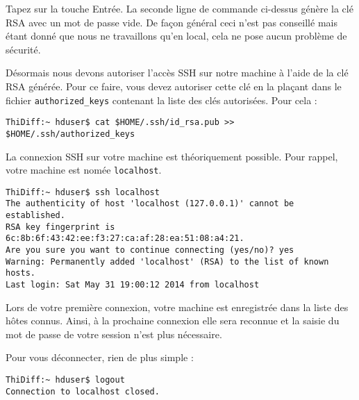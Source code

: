 \par Tapez sur la touche Entrée. La seconde ligne de commande ci-dessus génère la clé RSA avec un mot de passe vide. De façon général ceci n'est pas conseillé mais étant donné que nous ne travaillons qu'en local, cela ne pose aucun problème de sécurité.

\par Désormais nous devons autoriser l'accès SSH sur notre machine à l'aide de la clé RSA générée. Pour ce faire, vous devez autoriser cette clé en la plaçant dans le fichier \texttt{authorized\_keys} contenant la liste des clés autorisées. Pour cela :

\begin{verbatim}
ThiDiff:~ hduser$ cat $HOME/.ssh/id_rsa.pub >> $HOME/.ssh/authorized_keys
\end{verbatim}

\par La connexion SSH sur votre machine est théoriquement possible. Pour rappel, votre machine est nomée \texttt{localhost}.

\begin{verbatim}
ThiDiff:~ hduser$ ssh localhost
The authenticity of host 'localhost (127.0.0.1)' cannot be established.
RSA key fingerprint is 6c:8b:6f:43:42:ee:f3:27:ca:af:28:ea:51:08:a4:21.
Are you sure you want to continue connecting (yes/no)? yes
Warning: Permanently added 'localhost' (RSA) to the list of known hosts.
Last login: Sat May 31 19:00:12 2014 from localhost
\end{verbatim}

\par Lors de votre première connexion, votre machine est enregistrée dans la liste des hôtes connus. Ainsi, à la prochaine connexion elle sera reconnue et la saisie du mot de passe de votre session n'est plus nécessaire. 

\par Pour vous déconnecter, rien de plus simple :

\begin{verbatim}
ThiDiff:~ hduser$ logout
Connection to localhost closed.
\end{verbatim}

